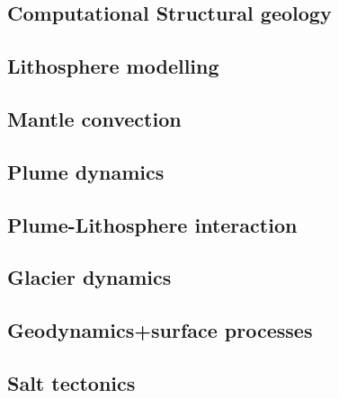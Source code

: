 \subsection*{Computational Structural geology}

\cite{acgf00}

\subsection*{Lithosphere modelling}

\cite{nefo93}
\cite{afrf07}
\cite{affr08}

\subsection*{Mantle convection}

\cite{olco80}
\cite{olyb84}
\cite{ande98}
\cite{nake07}
\cite{albe00}
\cite{arfw14}

\subsection*{Plume dynamics}

\cite{nasf94}

\subsection*{Plume-Lithosphere interaction}

\subsection*{Glacier dynamics}

\cite{asbl06}

\subsection*{Geodynamics+surface processes}

\cite{avbu96}
\cite{alle08}

\subsection*{Salt tectonics}

\cite{nabr93}




